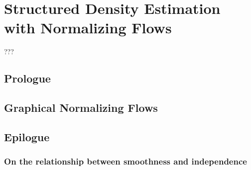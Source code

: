 \chapter{Structured Density Estimation with Normalizing Flows}\label{ch:06}

\begin{chapter_outline}

???
\end{chapter_outline}
\section{Prologue}
\section{Graphical Normalizing Flows}


\section{Epilogue}
\subsection{On the relationship between smoothness and independence}

